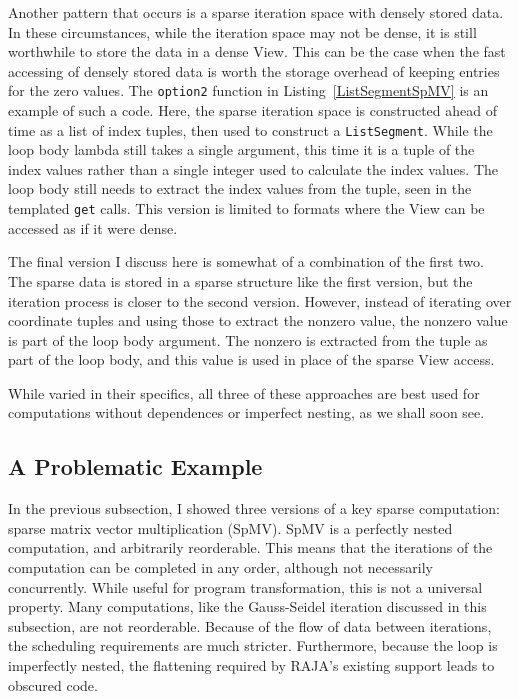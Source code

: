 Another pattern that occurs is a sparse iteration space with densely stored data.
In these circumstances, while the iteration space may not be dense, it is still worthwhile to store the data in a dense View.
This can be the case when the fast accessing of densely stored data is worth the storage overhead of keeping entries for the zero values.
The \verb.option2. function in Listing~\ref{ListSegmentSpMV} is an example of such a code.
Here, the sparse iteration space is constructed ahead of time as a list of index tuples, then used to construct a \verb.ListSegment..
While the loop body lambda still takes a single argument, this time it is a tuple of the index values rather than a single integer used to calculate the index values.
The loop body still needs to extract the index values from the tuple, seen in the templated \verb.get. calls.
This version is limited to formats where the View can be accessed as if it were dense.

The final version I discuss here is somewhat of a combination of the first two.
The sparse data is stored in a sparse structure like the first version, but the iteration process is closer to the second version.
However, instead of iterating over coordinate tuples and using those to extract the nonzero value, the nonzero value is part of the loop body argument.
The nonzero is extracted from the tuple as part of the loop body, and this value is used in place of the sparse View access.

While varied in their specifics, all three of these approaches are best used for computations without dependences or imperfect nesting, as we shall soon see.


\subsection{A Problematic Example}

In the previous subsection, I showed three versions of a key sparse computation: sparse matrix vector multiplication (SpMV).
SpMV is a perfectly nested computation, and arbitrarily reorderable.
This means that the iterations of the computation can be completed in any order, although not necessarily concurrently.
While useful for program transformation, this is not a universal property.
Many computations, like the Gauss-Seidel iteration discussed in this subsection, are not reorderable.
Because of the flow of data between iterations, the scheduling requirements are much stricter.
Furthermore, because the loop is imperfectly nested, the flattening required by RAJA's existing support leads to obscured code.

